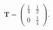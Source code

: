 \begin{align} & \mathbf{T} = \begin{pmatrix} \frac{1}{4} & \frac{1}{2} \\[4pt] 0 & \frac{1}{4} \end{pmatrix}. \end{align}
